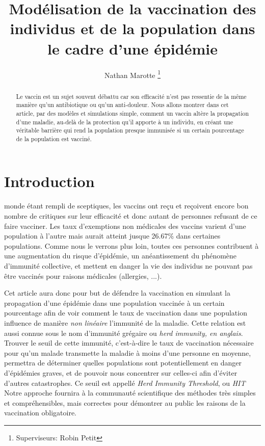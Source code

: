 \documentclass[journal, a4paper]{IEEEtran}
\begin{document}
	\title{Modélisation de la vaccination des individus et de la population dans le cadre d'une épidémie}
	\author{Nathan Marotte
	\thanks{Superviseurs: Robin Petit}}
	\maketitle

\begin{abstract}
	Le vaccin est un sujet souvent débattu car son efficacité n'est pas ressentie de la même manière qu'un antibiotique ou qu'un anti-douleur. Nous allons montrer dans cet article, par des modèles et simulations simple, comment un vaccin altère la propagation d'une maladie, au-delà de la protection qu'il apporte à un individu, en créant une véritable barrière qui rend la population presque immunisée si un certain pourcentage de la population est vacciné.
\end{abstract}

\section{Introduction}
	 monde étant rempli de sceptiques, les vaccins ont reçu et reçoivent encore bon nombre de critiques sur leur efficacité et donc autant de personnes refusant de ce faire vacciner. Les taux d'exemptions non médicales des vaccins varient d'une population à l'autre mais aurait atteint jusque 26.67\% \cite{NME_vaccine} dans certaines populations. Comme nous le verrons plus loin, toutes ces personnes contribuent à une augmentation du risque d'épidémie, un anéantissement du phénomène d'immunité collective, et mettent en danger la vie des individus ne pouvant pas être vaccinés pour raisons médicales (allergies, ...).\

	Cet article aura donc pour but de défendre la vaccination en simulant la propagation d'une épidémie dans une population vaccinée à un certain pourcentage afin de voir comment le taux de vaccination dans une population influence de manière \emph{non linéaire} l'immunité de la maladie. Cette relation est aussi connue sous le nom d'immunité grégaire ou \emph{herd immunity, en anglais}.
	Trouver le seuil de cette immunité, c'est-à-dire le taux de vaccination nécessaire pour qu'un malade transmette la maladie à moins d'une personne en moyenne, permettra de déterminer quelles populations sont potentiellement en danger d'épidémies graves, et de pouvoir nous concentrer sur celles-ci afin d'éviter d'autres catastrophes. Ce seuil est appellé \emph{Herd Immunity Threshold}, ou \emph{HIT}
	Notre approche fournira à la communauté scientifique des méthodes très simples et compréhensibles, mais correctes pour démontrer au public les raisons de la vaccination obligatoire.
\end{document}
